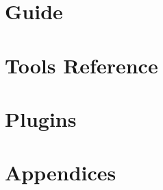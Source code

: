 \mainmatter


\part{Guide}













\part{Tools Reference}










\part{Plugins}

\part{Appendices}
\appendix



\printbibliography[heading=bibintoc]
